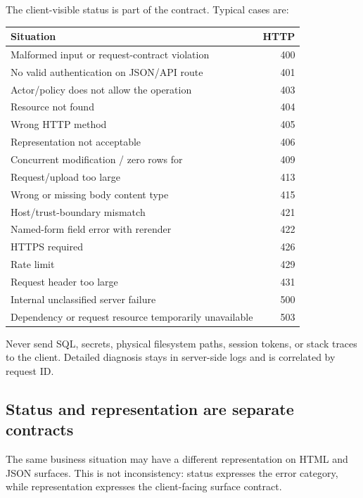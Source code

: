 The client-visible status is part of the contract. Typical cases are:

\begin{longtable}{L{0.61\textwidth}r}
\toprule
Situation & HTTP \\
\midrule
Malformed input or request-contract violation & 400 \\
No valid authentication on JSON/API route & 401 \\
Actor/policy does not allow the operation & 403 \\
Resource not found & 404 \\
Wrong HTTP method & 405 \\
Representation not acceptable & 406 \\
Concurrent modification / zero rows for  & 409 \\
Request/upload too large & 413 \\
Wrong or missing body content type & 415 \\
Host/trust-boundary mismatch & 421 \\
Named-form field error with rerender & 422 \\
HTTPS required & 426 \\
Rate limit & 429 \\
Request header too large & 431 \\
Internal unclassified server failure & 500 \\
Dependency or request resource temporarily unavailable & 503 \\
\bottomrule
\end{longtable}

Never send SQL, secrets, physical filesystem paths, session tokens, or stack traces to the client. Detailed diagnosis stays in server-side logs and is correlated by request ID.

\subsection*{Status and representation are separate contracts}

The same business situation may have a different representation on HTML and JSON surfaces. This is not inconsistency: status expresses the error category, while representation expresses the client-facing surface contract.

